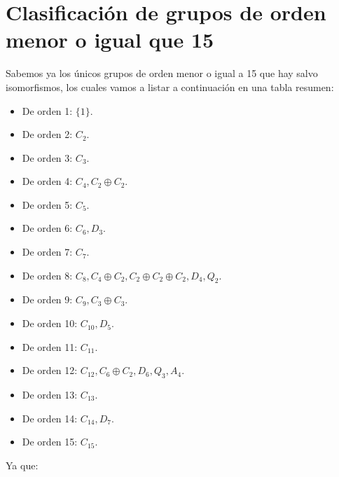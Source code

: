 \section{Clasificación de grupos de orden menor o igual que 15}
\noindent
Sabemos ya los únicos grupos de orden menor o igual a 15 que hay salvo isomorfismos, los cuales vamos a listar a continuación en una tabla resumen:
\begin{itemize}
    \item De orden 1: $\{1\}$.
    \item De orden 2: $C_2$.
    \item De orden 3: $C_3$.
    \item De orden 4: $C_4, C_2\oplus C_2$.
    \item De orden 5: $C_5$.
    \item De orden 6: $C_6, D_3$.
    \item De orden 7: $C_7$.
    \item De orden 8: $C_8, C_4\oplus C_2, C_2\oplus C_2\oplus C_2, D_4, Q_2$.
    \item De orden 9: $C_9, C_3\oplus C_3$.
    \item De orden 10: $C_{10}, D_5$.
    \item De orden 11: $C_{11}$.
    \item De orden 12: $C_{12}, C_6\oplus C_2, D_6, Q_3, A_4$.
    \item De orden 13: $C_{13}$.
    \item De orden 14: $C_{14}, D_7$.
    \item De orden 15: $C_{15}$.
\end{itemize}
Ya que:
